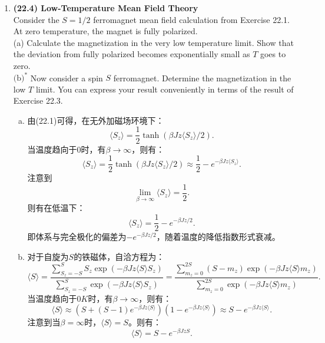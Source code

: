 \documentclass[reqno,a4paper,12pt]{amsart}
\begin{document}
\begin{enumerate}[1.]
\begin{tcolorbox}[breakable, colframe = black, colback = black!5!white]
\begin{enumerate}[(a)]
\end{enumerate}
\end{tcolorbox}

\item \textbf{(22.4) Low-Temperature Mean Field Theory} \\
Consider the $S=1/2$ ferromagnet mean field calculation from Exercise 22.1. At zero temperature, the magnet is fully polarized. \\
(a) Calculate the magnetization in the very low temperature limit. Show that the deviation from fully polarized becomes exponentially small as $T$ goes to zero. \\
$\text{(b)}^*$ Now consider a spin $S$ ferromagnet. Determine the magnetization in the low $T$ limit. You can express your result conveniently in terms of the result of Exercise 22.3.
\begin{tcolorbox}[breakable, colframe = black, colback = black!5!white]
\begin{enumerate}[(a)]

\item 由(22.1)可得，在无外加磁场环境下：
\[
	\langle S_z \rangle = \frac{1}{2} \tanh(\beta Jz\langle S_z \rangle/2).
\]
当温度趋向于0时，有$\beta \to \infty$，则有：
\[
	\langle S_z \rangle = \frac{1}{2} \tanh(\beta Jz\langle S_z \rangle/2) \approx \frac{1}{2} - e^{-\beta Jz\langle S_z \rangle}.
\]
注意到
\[
	\lim_{\beta \to \infty} \langle S_z \rangle = \frac{1}{2}.
\]
则有在低温下：
\[
	\langle S_z \rangle = \frac{1}{2} - e^{-\beta Jz/2}.
\]
即体系与完全极化的偏差为$-e^{-\beta Jz/2}$，随着温度的降低指数形式衰减。

\item 对于自旋为$S$的铁磁体，自洽方程为：
\[
	\langle S \rangle = \frac{\sum\limits_{S_z=-S}^S S_z \exp(-\beta Jz\langle S \rangle S_z)}{\sum\limits_{S_z=-S}^S \exp(-\beta Jz\langle S \rangle S_z)} = \frac{\sum\limits_{m_z=0}^{2S} (S-m_z) \exp(-\beta Jz\langle S \rangle m_z)}{\sum\limits_{m_z=0}^{2S} \exp(-\beta Jz\langle S \rangle m_z)}.
\]
当温度趋向于$0K$时，有$\beta\to\infty$，则有：
\[
	\langle S \rangle \approx (S + (S-1)e^{-\beta Jz\langle S \rangle}) (1 - e^{-\beta Jz\langle S \rangle}) \approx S - e^{-\beta Jz\langle S \rangle}.
\]
注意到当$\beta = \infty$时，$\langle S \rangle = S$。则有：
\[
	\langle S \rangle = S - e^{-\beta JzS}.
\]

\end{enumerate}
\end{tcolorbox}


\end{enumerate}
\end{document}

